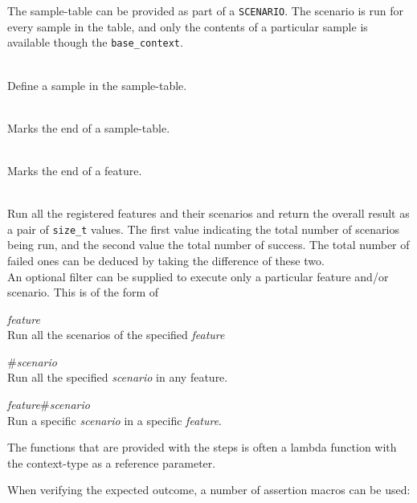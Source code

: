 \documentclass[10pt,a4paper,openany]{mudbook}
\makeatletter
\newcommand{\indextt}[2][]{\texttt{#2}\index{#2@\texttt{#2}#1}}
\makeatother
\begin{document}
\begin{description}
        The sample-table can be provided as part of a \texttt{SCENARIO}. The
        scenario is run for every sample in the table, and only the contents
        of a particular sample is available though the \indextt{base\_context}.
  \item[\indextt{SAMPLE(...)}] \hfill  \\
        Define a sample in the sample-table.
  \item[\indextt{END\_SAMPLES()}] \hfill  \\
        Marks the end of a sample-table.
  \item[\indextt{END\_FEATURE()}] \hfill  \\
        Marks the end of a feature.
  \item[\indextt{FEATURE\_RUN(...)}] \hfill  \\
        Run all the registered features and their scenarios and return the
        overall result as a pair of \texttt{size\_t} values. The first value
        indicating the total number of scenarios being run, and the second
        value the total number of success. The total number of failed ones can
        be deduced by taking the difference of these two. \hfill  \\
        An optional filter can be supplied to execute only a particular
        feature and/or scenario. This is of the form of
        \begin{description}
          \item \textit{feature} \hfill  \\
                Run all the scenarios of the specified \textit{feature}
          \item \#\textit{scenario} \hfill  \\
                Run all the specified \textit{scenario} in any feature.
          \item \textit{feature}\#\textit{scenario} \hfill  \\
                Run a specific \textit{scenario} in a specific \textit{feature}.
        \end{description}
\end{description}

\noindent
The functions that are provided with the steps is often a lambda function with
the context-type as a reference parameter.

When verifying the expected outcome, a number of assertion macros can be used:
\end{document}
